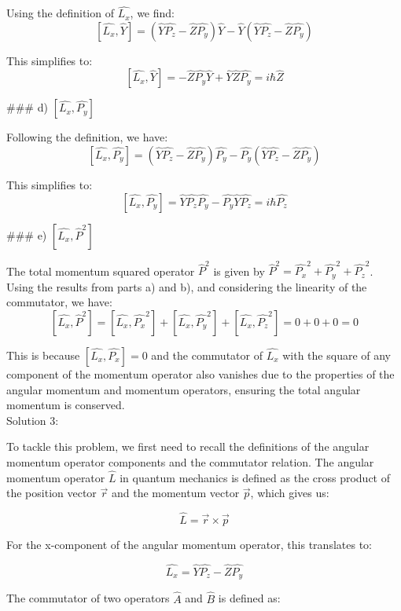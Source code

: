 \documentclass[a4paper,11pt]{article}
\begin{document}
Using the definition of \( \hat{L_{x}} \), we find:
\[ [ \hat{L_{x}}, \hat{Y} ] = (\hat{Y}\hat{P_{z}} - \hat{Z}\hat{P_{y}})\hat{Y} - \hat{Y}(\hat{Y}\hat{P_{z}} - \hat{Z}\hat{P_{y}}) \]

This simplifies to:
\[ [ \hat{L_{x}}, \hat{Y} ] = -\hat{Z}\hat{P_{y}}\hat{Y} + \hat{Y}\hat{Z}\hat{P_{y}} = i\hbar\hat{Z} \]

### d) \( [ \hat{L_{x}}, \hat{P_{y}} ] \)

Following the definition, we have:
\[ [ \hat{L_{x}}, \hat{P_{y}} ] = (\hat{Y}\hat{P_{z}} - \hat{Z}\hat{P_{y}})\hat{P_{y}} - \hat{P_{y}}(\hat{Y}\hat{P_{z}} - \hat{Z}\hat{P_{y}}) \]

This simplifies to:
\[ [ \hat{L_{x}}, \hat{P_{y}} ] = \hat{Y}\hat{P_{z}}\hat{P_{y}} - \hat{P_{y}}\hat{Y}\hat{P_{z}} = i\hbar\hat{P_{z}} \]

### e) \( [ \hat{L_{x}}, \hat{P}^{2} ] \)

The total momentum squared operator \( \hat{P}^{2} \) is given by \( \hat{P}^{2} = \hat{P_{x}}^{2} + \hat{P_{y}}^{2} + \hat{P_{z}}^{2} \). Using the results from parts a) and b), and considering the linearity of the commutator, we have:
\[ [ \hat{L_{x}}, \hat{P}^{2} ] = [ \hat{L_{x}}, \hat{P_{x}}^{2} ] + [ \hat{L_{x}}, \hat{P_{y}}^{2} ] + [ \hat{L_{x}}, \hat{P_{z}}^{2} ] = 0 + 0 + 0 = 0 \]

This is because \( [ \hat{L_{x}}, \hat{P_{x}} ] = 0 \) and the commutator of \( \hat{L_{x}} \) with the square of any component of the momentum operator also vanishes due to the properties of the angular momentum and momentum operators, ensuring the total angular momentum is conserved. \\

\noindent Solution 3:

To tackle this problem, we first need to recall the definitions of the angular momentum operator components and the commutator relation. The angular momentum operator \( \hat{L} \) in quantum mechanics is defined as the cross product of the position vector \( \vec{r} \) and the momentum vector \( \vec{p} \), which gives us:

\[
\hat{L} = \vec{r} \times \vec{p}
\]

For the x-component of the angular momentum operator, this translates to:

\[
\hat{L_{x}} = \hat{Y}\hat{P_{z}} - \hat{Z}\hat{P_{y}}
\]

The commutator of two operators \( \hat{A} \) and \( \hat{B} \) is defined as:
\end{document}
